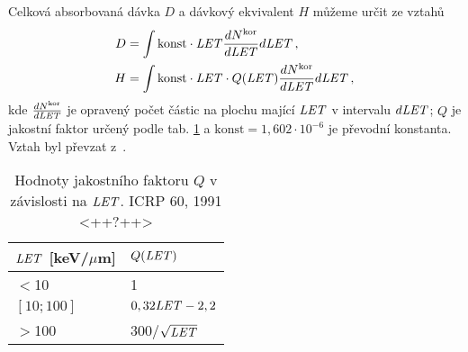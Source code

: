 Celková absorbovaná dávka $D$ a dávkový ekvivalent $H$ můžeme určit ze vztahů 
\begin{align}
  D&=\int\text{konst}\cdot\mathit{LET}\frac{dN^{\text{kor}}}{d\mathit{LET}}d\mathit{LET}\,,\label{eq:Davka}\\
  H&=\int\text{konst}\cdot\mathit{LET}\cdot Q(\mathit{LET})\frac{dN^{\text{kor}}}{d\mathit{LET}}d\mathit{LET}\,,\label{eq:EkvDavka}
\end{align}
kde $\frac{dN^{\text{kor}}}{d\mathit{LET}}$ je opravený počet částic na plochu mající $\mathit{LET}$ v intervalu $d\mathit{LET}$; $Q$ je jakostní faktor určený podle tab. \ref{tab:detektory_Q} a $\text{konst}=1,602\cdot 10^{-6}$ je převodní konstanta. Vztah byl převzat z~\cite{thesisKPBrabcova}.

\begin{table}[H]
  \centering
  \caption{Hodnoty jakostního faktoru $Q$ v závislosti na $\mathit{LET}$. ICRP 60, 1991 <++?++>}
  \label{tab:detektory_Q}
  \begin{tabular}{ll}
	\toprule
	$\mathit{LET}$ [keV/$\mu$m]&$Q(\mathit{LET})$ \\
	\midrule
$<$10&1\\
$[10;100]$&$0,32\mathit{LET}-2,2$\\
$>$100&300/$\sqrt{\mathit{LET}}$\\
	\bottomrule
  \end{tabular}
\end{table}







